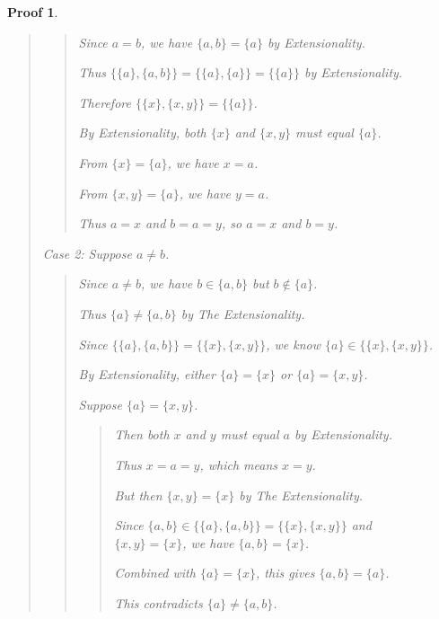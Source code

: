 \documentclass[12pt]{article}
\theoremstyle{proofstyle}
\newtheorem*{proof*}{Proof}
\begin{document}
\begin{enumerate}[left=0pt, itemsep=2em, parsep=1em]
\begin{enumerate}[label=(\alph*), itemsep=1.5em, leftmargin=2em]
\begin{proof*}
\begin{quote}
        \begin{quote}
            Since $a = b$, we have $\{a, b\} = \{a\}$ by Extensionality.
            
            Thus $\{\{a\}, \{a, b\}\} = \{\{a\}, \{a\}\} = \{\{a\}\}$ by Extensionality.
            
            Therefore $\{\{x\}, \{x, y\}\} = \{\{a\}\}$.
            
            By Extensionality, both $\{x\}$ and $\{x, y\}$ must equal $\{a\}$.
            
            From $\{x\} = \{a\}$, we have $x = a$.
            
            From $\{x, y\} = \{a\}$, we have $y = a$.
            
            Thus $a = x$ and $b = a = y$, so $a = x$ and $b = y$.
        \end{quote}
        
        \textit{Case 2:} Suppose $a \neq b$.
        
        \begin{quote}
            Since $a \neq b$, we have $b \in \{a, b\}$ but $b \notin \{a\}$.
            
            Thus $\{a\} \neq \{a, b\}$ by The Extensionality.
            
            Since $\{\{a\}, \{a, b\}\} = \{\{x\}, \{x, y\}\}$, we know $\{a\} \in \{\{x\}, \{x, y\}\}$.
            
            By Extensionality, either $\{a\} = \{x\}$ or $\{a\} = \{x, y\}$.
            
            Suppose $\{a\} = \{x, y\}$.
            
            \begin{quote}
                Then both $x$ and $y$ must equal $a$ by Extensionality.
                
                Thus $x = a = y$, which means $x = y$.
                
                But then $\{x, y\} = \{x\}$ by The Extensionality.
                
                Since $\{a, b\} \in \{\{a\}, \{a, b\}\} = \{\{x\}, \{x, y\}\}$ and \\ $\{x, y\} = \{x\}$, we have $\{a, b\} = \{x\}$.
                
                Combined with $\{a\} = \{x\}$, this gives $\{a, b\} = \{a\}$.
                
                This contradicts $\{a\} \neq \{a, b\}$.
            \end{quote}
            

\end{quote}
\end{quote}
\end{proof*}
\end{enumerate}
\end{enumerate}
\end{document}
